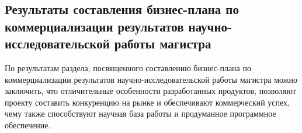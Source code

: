 \documentclass[../main]{subfiles}
\begin{document}
\subsection{Результаты составления бизнес-плана по коммерциализации результатов научно-исследовательской работы магистра}
По результатам раздела, посвященного составлению бизнес-плана по коммерциализации результатов научно-исследовательской работы магистра можно заключить, что отличительные особенности разработанных продуктов, позволяют проекту составить конкуренцию на рынке и обеспечивают коммерческий успех, чему также способствуют научная база работы и продуманное программное обеспечение.
\end{document}
